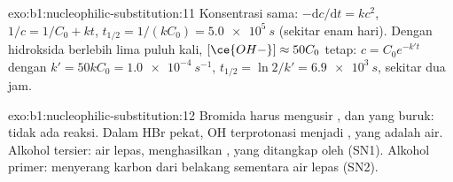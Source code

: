 \begin{solution}{exo:b1:nucleophilic-substitution:11}
Konsentrasi sama: $-\mathrm{d}c/\mathrm{d}t = kc^2$, $1/c = 1/C_0 + kt$,
$t_{1/2} = 1/(kC_0) = \qty{5.0e5}{s}$ (sekitar enam hari). Dengan
hidroksida berlebih lima puluh kali, $[\ce{OH-}] \approx 50C_0$ tetap:
$c = C_0
e^{-k't}$ dengan $k' = 50kC_0 = \qty{1.0e-4}{s^{-1}}$, $t_{1/2} = \ln 2/k' =
\qty{6.9e3}{s}$, sekitar dua jam.
\end{solution}

\begin{solution}{exo:b1:nucleophilic-substitution:12}
Bromida harus mengusir ,  dan  yang buruk:
tidak ada reaksi. Dalam HBr pekat, OH terprotonasi menjadi , yang
 adalah air. Alkohol tersier: air lepas, menghasilkan
, yang ditangkap oleh  (SN1). Alkohol primer:
 menyerang karbon  dari belakang sementara air lepas
(SN2).
\end{solution}


